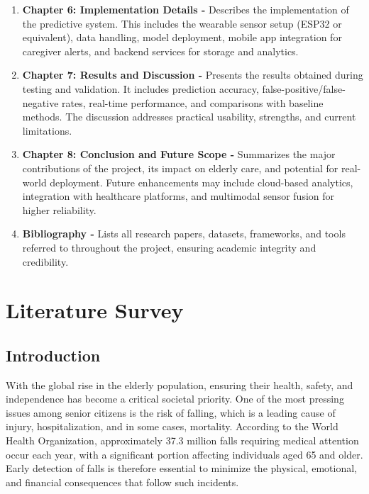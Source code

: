 \documentclass[a4paper, 12pt]{report}
\begin{document}
\begin{enumerate}[itemsep=-4pt, label=\textbf{\roman*.}]
    \item \textbf{Chapter 6: Implementation Details -} Describes the implementation of the predictive system. This includes the wearable sensor setup (ESP32 or equivalent), data handling, model deployment, mobile app integration for caregiver alerts, and backend services for storage and analytics.
    
    \item \textbf{Chapter 7: Results and Discussion -} Presents the results obtained during testing and validation. It includes prediction accuracy, false-positive/false-negative rates, real-time performance, and comparisons with baseline methods. The discussion addresses practical usability, strengths, and current limitations.
    
    \item \textbf{Chapter 8: Conclusion and Future Scope -} Summarizes the major contributions of the project, its impact on elderly care, and potential for real-world deployment. Future enhancements may include cloud-based analytics, integration with healthcare platforms, and multimodal sensor fusion for higher reliability.
    
    \item \textbf{Bibliography -} Lists all research papers, datasets, frameworks, and tools referred to throughout the project, ensuring academic integrity and credibility.
\end{enumerate}


\chapter{Literature Survey}

\section{Introduction}
With the global rise in the elderly population, ensuring their health, safety, and independence has become a critical societal priority. One of the most pressing issues among senior citizens is the risk of falling, which is a leading cause of injury, hospitalization, and in some cases, mortality. According to the World Health Organization, approximately 37.3 million falls requiring medical attention occur each year, with a significant portion affecting individuals aged 65 and older. Early detection of falls is therefore essential to minimize the physical, emotional, and financial consequences that follow such incidents.
\end{document}
